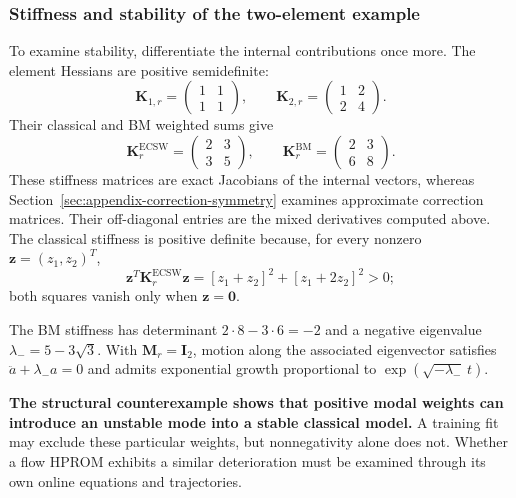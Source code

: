 \documentclass[a4paper,12pt]{article}
\newcommand{\vect}[1]{\boldsymbol{#1}}
\newcommand{\matr}[1]{\boldsymbol{#1}}
\begin{document}
\subsubsection{Stiffness and stability of the two-element example}
\label{sec:appendix-structural-stability-example}

To examine stability, differentiate the internal contributions once
more. The element Hessians are positive semidefinite:
\[
 \matr{K}_{1,r}=\begin{pmatrix}1&1\\1&1\end{pmatrix},
 \qquad
 \matr{K}_{2,r}=\begin{pmatrix}1&2\\2&4\end{pmatrix}.
\]
Their classical and BM weighted sums give
\begin{equation}
 \matr{K}_r^{\mathrm{ECSW}}
 =\begin{pmatrix}2&3\\3&5\end{pmatrix},
 \qquad
 \matr{K}_r^{\mathrm{BM}}
 =\begin{pmatrix}2&3\\6&8\end{pmatrix}.
 \label{eq:appendix-negative-eigenvalue-example}
\end{equation}
These stiffness matrices are exact Jacobians of the internal vectors, whereas Section~\ref{sec:appendix-correction-symmetry} examines approximate correction matrices. Their off-diagonal entries are the mixed derivatives computed above. The classical stiffness is positive definite because, for every nonzero $\vect{z}=(z_1,z_2)^T$,
\[
 \vect{z}^T\matr{K}_r^{\mathrm{ECSW}}\vect{z}
 =[z_1+z_2]^2+[z_1+2z_2]^2>0;
\]
both squares vanish only when $\vect{z}=\vect{0}$.

The BM stiffness has determinant $2\cdot8-3\cdot6=-2$ and a negative
eigenvalue $\lambda_-=5-3\sqrt3$. With $\matr{M}_r=\matr{I}_2$, motion
along the associated eigenvector satisfies $\ddot a+\lambda_-a=0$ and
admits exponential growth proportional to $\exp(\sqrt{-\lambda_-}\,t)$.

\textbf{The structural counterexample shows that positive modal weights can introduce an unstable mode into a stable classical model.} A training fit may exclude these particular weights, but nonnegativity alone does not. Whether a flow HPROM exhibits a similar deterioration must be examined through its own online equations and trajectories.
\end{document}
